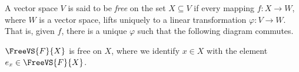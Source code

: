 \begin{dfn}
A vector space $V$ is said to be \emph{free} on the set $X \subseteq V$ if every mapping $f : X \rightarrow W$, where $W$ is a vector space, lifts uniquely to a linear transformation $\varphi : V \rightarrow W$. That is, given $f$, there is a unique $\varphi$ such that the following diagram commutes.
\begin{center}
\end{center}
\end{dfn}

\begin{prp}
$\FreeVS{F}{X}$ is free on $X$, where we identify $x \in X$ with the element $e_x \in \FreeVS{F}{X}$.
\end{prp}

